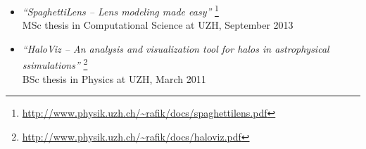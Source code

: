\documentclass[12pt]{article}
\begin{document}
\begin{itemize}
  \item
    \emph{``SpaghettiLens -- Lens modeling made easy''}
    \footnote{\url{http://www.physik.uzh.ch/~rafik/docs/spaghettilens.pdf}}\\
    MSc thesis in Computational Science at UZH, September 2013
  \item
    \emph{``HaloViz --  An analysis and visualization tool for halos in astrophysical \\ ssimulations''}
    \footnote{\url{http://www.physik.uzh.ch/~rafik/docs/haloviz.pdf}}\\
     BSc thesis in Physics at UZH, March 2011
\end{itemize}
\end{document}

